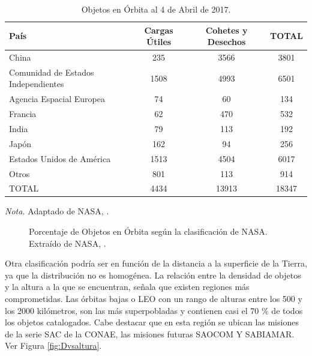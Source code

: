 \begin{table}
 \caption[Objetos en \'Orbita al 4 de Abril de 2017.]{Objetos en \'Orbita al 4 de Abril de 2017.}
 \begin{tabular}{lccc}
  \hline 
  \rowcolor{lightgray}
  \bf{Pa\'is}  &    \bf{Cargas \'Utiles} & \bf{Cohetes y Desechos} & TOTAL\\
  \hline 
  China & 235 & 3566&3801\\
  Comunidad de Estados Independientes & 1508&4993&6501\\
  Agencia Espacial Europea &74&60&134\\
  Francia & 62&470&532\\
  India & 79 & 113 & 192\\
  Jap\'on & 162 & 94 & 256\\
  Estados Unidos de Am\'erica & 1513 & 4504 & 6017\\
  Otros & 801 & 113 & 914 \\
  \hline
  \rowcolor{lightgray}
  TOTAL & 4434 & 13913 & 18347 \\
  \hline
 \end{tabular}
 \label{tab:objpais}
 \begin{flushleft}
\small {\it{Nota.}}  Adaptado de NASA, \citep{ODQN}.
\end{flushleft}
\end{table}

\begin{figure}[!h]
\centering
    \caption[Objetos en \'Orbita seg\'un NASA.]{Porcentaje de Objetos en \'Orbita seg\'un la clasificaci\'on de NASA. Extra\'ido de NASA, \citep{ODQN}.}
    \label{fig:catxtipo}
\end{figure}

Otra clasificaci\'on podr\'ia ser en funci\'on de la distancia a la superficie de la Tierra, ya que la distribuci\'on no es homog\'enea. La relaci\'on entre la densidad de objetos y la altura a la que se encuentran, señala que existen regiones m\'as comprometidas.
Las \'orbitas bajas o \ac{LEO} con un rango de alturas entre los 500 y los 2000 kil\'ometros, son las m\'as superpobladas y contienen casi el 70 \% de todos los objetos catalogados. 
Cabe destacar que en esta regi\'on se ubican las misiones de la serie SAC de la CONAE, las misiones futuras SAOCOM Y SABIAMAR. Ver Figura \ref{fig:Dvsaltura}.\\

